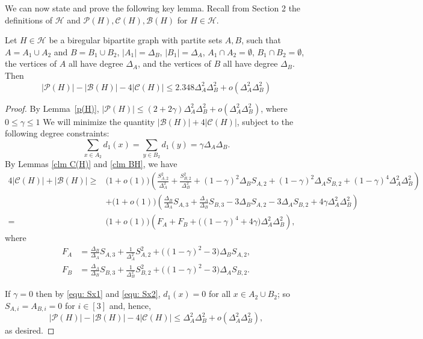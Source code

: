 \documentclass[11pt]{amsart}
\newcommand{\pp}{\mathcal{P}}
\newcommand{\cc}{\mathcal{C}}
\newcommand{\bb}{\mathcal{B}}
\newcommand{\hh}{\mathcal{H}}
\begin{document}
We can now state and prove the following key lemma. Recall from Section 2 the definitions of  $\hh$ and $\pp(H), \cc(H),\bb(H)$ for $H\in \hh$.
\begin{lemma}\label{lem PBC upbd}
   Let $H\in \hh$ be a biregular bipartite graph with partite sets $A,B$, such that $A=A_1\cup A_2$ and $B=B_1\cup B_2$,  $|A_1|=\Delta_B$, $|B_1|=\Delta_A$, $A_1\cap  A_2=\emptyset$, $B_1\cap B_2=\emptyset$,  the vertices of $A$ all have degree $\Delta_A$, and the vertices of $B$ all have degree $\Delta_B$.   Then 
   $$|\mathcal{P}(H)| - |\mathcal{B}(H)| - 4|\mathcal{C}(H)|\le  2.348 \Delta_A^2\Delta_B^2 + o(\Delta_A^2\Delta_B^2)$$
\end{lemma}
\begin{proof}
By Lemma~\ref{p(H)}, $|\mathcal{P}(H)| \le (2+2\gamma)\Delta_A^2\Delta_B^2 + o(\Delta_A^2\Delta_B^2)$, where   $0 \le \gamma \le 1$ We will minimize the quantity $|\mathcal{B}(H)|+4|\mathcal{C}(H)|$, subject to the following degree constraints:
\[ \sum_{x\in A_2}d_1(x) = \sum_{y\in B_2}d_1(y) = \gamma \Delta_A\Delta_B.\]
By Lemmas \ref{clm C(H)} and \ref{clm BH}, we have
\begin{align*}
    4|\cc(H)|+|\bb(H)|
    \ge &\big(1+o(1)\big)\left(\frac{S_{A,2}^2}{\Delta_A^2} + \frac{S_{B,2}^2}{\Delta_B^2} + (1-\gamma)^2\Delta_B S_{A,2} + (1-\gamma)^2\Delta_A S_{B,2} + (1-\gamma)^4\Delta_A^2\Delta_B^2   \right)\\
    & +\big(1+o(1)\big)\left(  \frac{\Delta_B}{\Delta_A}S_{A,3}+\frac{\Delta_A}{\Delta_B} S_{B,3}- 3\Delta_B S_{A,2} -3\Delta_A S_{B,2} + 4\gamma \Delta_A^2\Delta_B^2
        \right) \\
    =&\big(1+o(1)\big)\left( F_A +  F_B +\big((1-\gamma)^4+4\gamma\big)\Delta_A^2\Delta_B^2    \right),
\end{align*} 
where
\begin{align*}
F_A&=\frac{\Delta_B}{\Delta_A}S_{A,3}+\frac{1}{\Delta_A^2}S_{A,2}^2+\big((1-\gamma)^2-3\big)\Delta_BS_{A,2},\\
F_B&=\frac{\Delta_A}{\Delta_B}S_{B,3}+\frac{1}{\Delta_B^2}S_{B,2}^2+\big( (1-\gamma)^2-3\big)\Delta_AS_{B,2}.
\end{align*}

If $\gamma=0$ then by \eqref{equ: Sx1} and \eqref{equ: Sx2}, $d_1(x)=0$ for all $x\in A_2\cup B_2$; so $S_{A,i}=A_{B,i}=0$ for $i\in [3]$ and, hence,
\[
|\mathcal P(H)|-|\mathcal B(H)|-4|\mathcal C(H)|
\le \Delta_A^2\Delta_B^2+o(\Delta_A^2\Delta_B^2),
\]
as desired. 


\end{proof}
\end{document}
